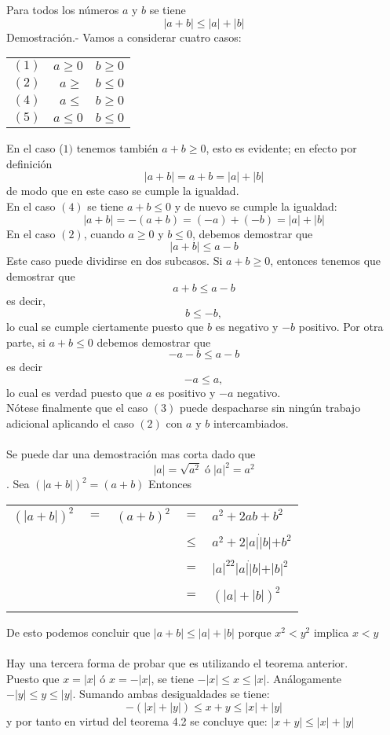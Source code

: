 \begin{teo}
Para todos los números $a$ \; y \; $b$ se tiene $$|a+b|\leq |a|+|b|$$
Demostración.- \; Vamos a considerar cuatro casos:
\begin{center}
\begin{tabular}{c r r}
$(1)$&$a\geq 0$&$b\geq 0$\\
$(2)$&$a\geq $&$b\leq 0$\\
$(4)$&$a\leq $&$b \geq 0$\\
$(5)$&$a\leq 0$&$b \leq 0$\\
\end{tabular}
\end{center}
En el caso ($1)$ tenemos también $a+b\geq 0$, esto es evidente; en efecto por definición $$|a+b|=a+b=|a|+|b|$$ de modo que en este caso se cumple la igualdad.\\
En el caso $(4)$ se tiene $a+b\leq 0$ y de nuevo se cumple la igualdad: $$|a+b|=-(a+b)=(-a)+(-b)=|a|+|b|$$
En el caso $(2)$, cuando $a\geq 0$ y $b\leq 0$, debemos demostrar que $$|a+b|\leq a - b$$ Este caso puede dividirse en dos subcasos. Si $a+b\geq 0$, entonces tenemos que demostrar que $$a+b \leq a-b$$ es decir, $$b\leq -b,$$  lo cual se cumple ciertamente puesto que $b$ es negativo y $-b$ positivo. Por otra parte, si $a+b\leq 0$ debemos demostrar que $$-a-b\leq a-b$$ es decir $$-a\leq a,$$ lo cual es verdad puesto que $a$ es positivo y \; $-a$ negativo.\\
Nótese finalmente que el caso $(3)$ puede despacharse sin ningún trabajo adicional aplicando el caso $(2)$ con $a$ \; y \; $b$ intercambiados.\\\\ 
Se puede dar una demostración mas corta dado que $$|a|=\sqrt{a^2} \; ó \; |a|^2=a^2$$. Sea $(|a+b|)^2=(a+b)$ Entonces 
\begin{center}
\begin{tabular}{r c r c l}
$(|a+b|)^2$&$=$&$(a+b)^2$&$=$&$a^2+2ab+b^2$\\\\
&&&$\leq$&$a^2+2|a|\dot |b|+b^2$\\\\
&&&$=$&$|a|^22|a|\dot |b|+|b|^2$\\\\
&&&$=$&$(|a|+|b|)^2$\\\\
\end{tabular}
\end{center}
De esto podemos concluir que $|a+b|\leq |a|+|b|$ porque $x^2<y^2$ implica $x<y$\\\\
Hay una tercera forma de probar que es utilizando el teorema anterior.\\
Puesto que $x=|x|$ \; ó \; $x=-|x|$, se tiene $-|x|\leq x \leq |x|$. Análogamente $-|y| \leq y \leq |y|$. Sumando ambas desigualdades se tiene: $$-(|x|+|y|)\leq x+y \leq |x|+|y|$$ y por tanto en virtud del teorema 4.2 se concluye que: $|x+y|\leq |x|+|y|$\\\\  
\end{teo}

